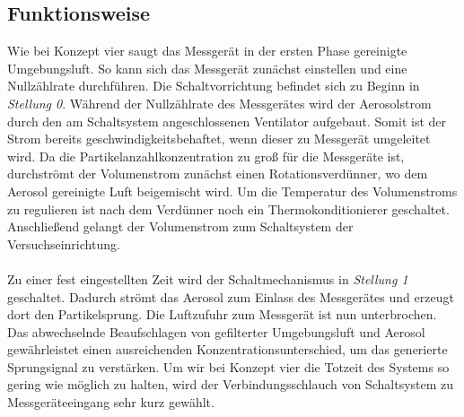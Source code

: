 \subsection{Funktionsweise}
Wie bei Konzept vier saugt das Messger\"{a}t in der ersten Phase gereinigte Umgebungsluft. So kann sich das Messger\"{a}t zun\"{a}chst einstellen und eine Nullz\"{a}hlrate durchf\"{u}hren. Die Schaltvorrichtung befindet sich zu Beginn in \textit{Stellung 0}. W\"{a}hrend der Nullz\"{a}hlrate des Messger\"{a}tes wird der Aerosolstrom durch den am Schaltsystem angeschlossenen Ventilator aufgebaut. Somit ist der Strom bereits geschwindigkeitsbehaftet, wenn dieser zu Messger\"{a}t umgeleitet wird. Da die Partikelanzahlkonzentration zu gro{\ss} f\"{u}r die Messger\"{a}te ist, durchstr\"{o}mt der Volumenstrom zun\"{a}chst einen Rotationsverd\"{u}nner, wo dem Aerosol gereinigte Luft beigemischt wird. Um die Temperatur des Volumenstroms zu regulieren ist nach dem Verd\"{u}nner noch ein Thermokonditionierer geschaltet. Anschlie{\ss}end gelangt der Volumenstrom zum Schaltsystem der Versuchseinrichtung.
\\\\
Zu einer fest eingestellten Zeit wird der Schaltmechanismus in \textit{Stellung 1} geschaltet. Dadurch str\"{o}mt das Aerosol zum Einlass des Messger\"{a}tes und erzeugt dort den Partikelsprung. Die Luftzufuhr zum Messger\"{a}t ist nun unterbrochen. Das abwechselnde Beaufschlagen von gefilterter Umgebungsluft und Aerosol gew\"{a}hrleistet einen ausreichenden Konzentrationsunterschied, um das generierte Sprungsignal zu verst\"{a}rken. Um wir bei Konzept vier die Totzeit des Systems so gering wie m\"{o}glich zu halten, wird der Verbindungsschlauch von Schaltsystem zu Messger\"{a}teeingang sehr kurz gew\"{a}hlt.